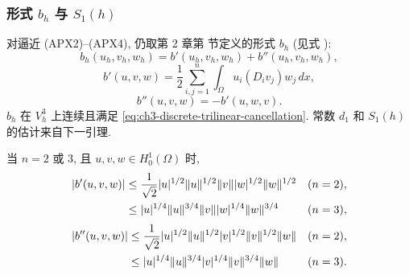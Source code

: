 \hypertarget{chapter-03-page-270}{}
\subsubsection{形式 $b_h$ 与 $S_1(h)$}
对逼近 (APX2)--(APX4), 仍取第 2 章第  节定义的形式 $b_h$ (见式 ):
\begin{equation}
b_h(u_h,v_h,w_h)=b'(u_h,v_h,w_h)+b''(u_h,v_h,w_h),
\label{eq:ch3-conforming-bh-decomposition}
\end{equation}
\begin{equation}
b'(u,v,w)=\frac12\sum_{i,j=1}^n\int_\Omega u_i(D_iv_j)w_j\,dx,
\label{eq:ch3-conforming-b-prime}
\end{equation}
\begin{equation}
b''(u,v,w)=-b'(u,w,v).
\label{eq:ch3-conforming-b-double-prime}
\end{equation}
$b_h$ 在 $V_h^3$ 上连续且满足 \eqref{eq:ch3-discrete-trilinear-cancellation}. 常数 $d_1$ 和 $S_1(h)$ 的估计来自下一引理.

\begin{Lemma}
\label{lem:ch3-conforming-trilinear-components}
当 $n=2$ 或 $3$, 且 $u,v,w\in H_0^1(\Omega)$ 时,
\begin{align}
|b'(u,v,w)|
&\leq\frac1{\sqrt2}|u|^{1/2}\lVert u\rVert^{1/2}\lVert v\rVert
|w|^{1/2}\lVert w\rVert^{1/2} &&(n=2),\notag\\
&\leq|u|^{1/4}\lVert u\rVert^{3/4}\lVert v\rVert
|w|^{1/4}\lVert w\rVert^{3/4} &&(n=3),
\label{eq:ch3-conforming-b-prime-estimate}
\end{align}
\begin{align}
|b''(u,v,w)|
&\leq\frac1{\sqrt2}|u|^{1/2}\lVert u\rVert^{1/2}
|v|^{1/2}\lVert v\rVert^{1/2}\lVert w\rVert &&(n=2),\notag\\
&\leq|u|^{1/4}\lVert u\rVert^{3/4}
|v|^{1/4}\lVert v\rVert^{3/4}\lVert w\rVert &&(n=3).
\label{eq:ch3-conforming-b-double-prime-estimate}
\end{align}
\end{Lemma}

